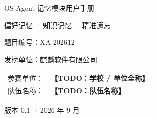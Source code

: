 \documentclass[zihao=-4,a4paper]{ctexart}
\newcommand{\todo}[1]{\textcolor{todored}{\textbf{【TODO：#1】}}}
\begin{document}
\begin{titlepage}
  \centering
  \vspace*{20mm}
  {\heiti{} OS Agent 记忆模块用户手册\par}
  \vspace{8mm}
  { 偏好记忆 · 知识记忆 · 精准遗忘\par}
  \vspace{6mm}
  { 题目编号：XA-202612\par}
  \vspace{4mm}
  { 发榜单位：麒麟软件有限公司\par}
  \vspace{22mm}
  \begin{tabular}{rl}
    参赛单位： & \todo{学校 / 单位全称} \\
    队伍名称： & \todo{队伍名称}         \\
  \end{tabular}
  \vfill
  { 版本 0.1 · 2026 年 9 月\par}
  \vspace*{8mm}
\end{titlepage}

\tableofcontents
\newpage








\end{document}
